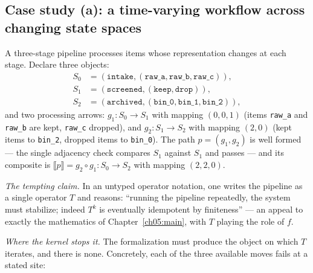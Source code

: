 \subsection{Case study (a): a time-varying workflow across changing state
spaces}
\label{ch06:sec:case-a}

\begin{example}[Setup]
\label{ch06:ex:case-a}
A three-stage pipeline processes items whose representation changes at each
stage. Declare three objects:
\begin{align*}
  S_0 &= (\texttt{intake}, (\texttt{raw\_a}, \texttt{raw\_b},
          \texttt{raw\_c})), \\
  S_1 &= (\texttt{screened}, (\texttt{keep}, \texttt{drop})), \\
  S_2 &= (\texttt{archived}, (\texttt{bin\_0}, \texttt{bin\_1},
          \texttt{bin\_2})),
\end{align*}
and two processing arrows: $g_1 : S_0 \to S_1$ with mapping $(0, 0, 1)$
(items \texttt{raw\_a} and \texttt{raw\_b} are kept, \texttt{raw\_c}
dropped), and $g_2 : S_1 \to S_2$ with mapping $(2, 0)$ (kept items to
\texttt{bin\_2}, dropped items to \texttt{bin\_0}). The path
$p = (g_1, g_2)$ is well formed --- the single adjacency check compares
$S_1$ against $S_1$ and passes --- and its composite is
$\llbracket p \rrbracket = g_2 \circ g_1 : S_0 \to S_2$ with mapping
$(2, 2, 0)$.
\end{example}

\emph{The tempting claim.} In an untyped operator notation, one writes the
pipeline as a single operator $T$ and reasons: ``running the pipeline
repeatedly, the system must stabilize; indeed $T^{k}$ is eventually
idempotent by finiteness'' --- an appeal to exactly the mathematics of
Chapter~\ref{ch05:main}, with $T$ playing the role of $f$.

\emph{Where the kernel stops it.} The formalization must produce the object
on which $T$ iterates, and there is none. Concretely, each of the three
available moves fails at a stated site:

